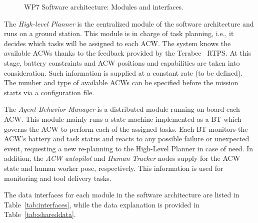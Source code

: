 \begin{figure}[ht]
{}
	\caption{WP7 Software architecture: Modules and interfaces.}
	\label{fig:WP7scheme}
\end{figure}

The \textit{High-level Planner} is the centralized module of the software architecture and runs on a ground station. This module is in charge of task planning, i.e., it decides which tasks will be assigned to each \gls{ACW}. The system knows the available \glspl{ACW} thanks to the feedback provided by the Terabee~ \gls{RTPS}. At this stage, battery constraints and \gls{ACW} positions and capabilities are taken into consideration. Such information is supplied at a constant rate (to be defined). The number and type of available \glspl{ACW} can be specified before the mission starts via a configuration file. 

The \textit{Agent Behavior Manager} is a distributed module running on board each \gls{ACW}. This module mainly runs a state machine implemented as a \gls{BT} which governs the \gls{ACW} to perform each of the assigned tasks. Each \gls{BT} monitors the \gls{ACW}'s battery and task status and reacts to any possible failure or unexpected event, requesting a new re-planning to the High-Level Planner in case of need. In addition, the \textit{ACW autopilot} and \textit{Human Tracker} nodes supply for the ACW state and human worker pose, respectively. This information is used for monitoring and tool delivery tasks.  

The data interfaces for each module in the software architecture are listed in Table~\ref{tab:interfaces}, while the data explanation is provided in Table~\ref{tab:shareddata}.

